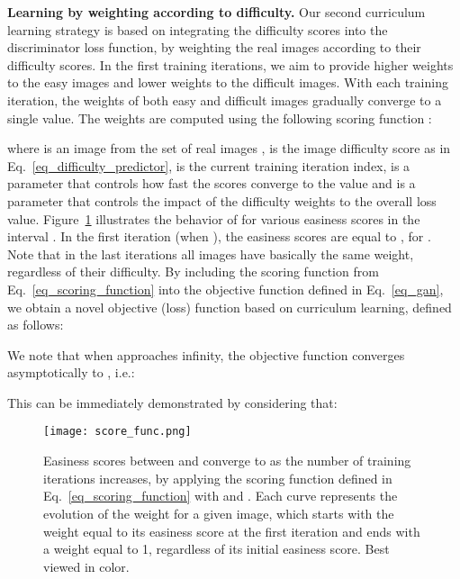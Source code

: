 \documentclass[10pt,twocolumn,letterpaper]{article}
\begin{document}
\noindent
{\bf Learning by weighting according to difficulty.}
Our second curriculum learning strategy is based on integrating the difficulty scores into the discriminator loss function, by weighting the real images according to their difficulty scores. In the first training iterations, we aim to provide higher weights to the easy images and lower weights to the difficult images. With each training iteration, the weights of both easy and difficult images gradually converge to a single value. The weights are computed using the following scoring function :

where  is an image from the set of real images ,  is the image difficulty score as in Eq.~\eqref{eq_difficulty_predictor},  is the current training iteration index,  is a parameter that controls how fast the scores converge to the value  and  is a parameter that controls the impact of the difficulty weights to the overall loss value. Figure~\ref{fig_scoring_function} illustrates the behavior of  for various easiness scores in the interval . In the first iteration (when ), the easiness scores are equal to , for . Note that in the last iterations all images have basically the same weight, regardless of their difficulty. By including the scoring function  from Eq.~\eqref{eq_scoring_function} into the objective function  defined in Eq.~\eqref{eq_gan}, we obtain a novel objective (loss) function  based on curriculum learning, defined as follows:

We note that when  approaches infinity, the objective function  converges asymptotically to , i.e.:

This can be immediately demonstrated by considering that:


\begin{figure}[!t]
\begin{center}
\texttt{[image: score\_func.png]}
\end{center}
\vspace*{-0.3cm}
\caption{Easiness scores between  and  converge to  as the number of training iterations increases, by applying the scoring function defined in Eq.~\eqref{eq_scoring_function} with  and . Each curve represents the evolution of the weight for a given image, which starts with the weight equal to its easiness score  at the first iteration and ends with a weight equal to 1, regardless of its initial easiness score. Best viewed in color.}
\label{fig_scoring_function}
\vspace*{-0.4cm}
\end{figure}
\end{document}
